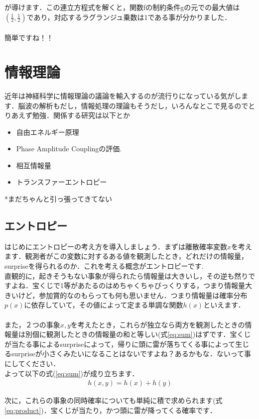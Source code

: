 \documentclass[11pt,a4paper,uplatex]{ujreport}
\begin{document}
が導けます．この連立方程式を解くと，関数fの制約条件gの元での最大値は$(\frac{1}{2}, \frac{1}{2})$であり，対応するラグランジュ乗数は1である事が分かりました．\\
\\

簡単ですね！！

\chapter{情報理論}
近年は神経科学に情報理論の議論を輸入するのが流行りになっている気がします．脳波の解析もだし，情報処理の理論もそうだし，いろんなとこで見るのでとりあえず勉強．関係する研究は以下とか\\
\begin{itemize}
 \item{自由エネルギー原理\cite{fep}}
 \item{Phase Amplitude Couplingの評価. \cite{tort}}
 \item{相互情報量}
 \item{トランスファーエントロピー}
\end{itemize}
*まだちゃんと引っ張ってきてない
\section{エントロピー}
はじめにエントロピーの考え方を導入しましょう．まずは離散確率変数$x$を考えます．観測者がこの変数に対するある値を観測したとき，どれだけの情報量，surpriseを得られるのか．これを考える概念がエントロピーです.\\
直観的に，起きそうもない事象が得られたら情報量は大きいし，その逆も然りですよね．宝くじで1等があたるのはめちゃくちゃびっくりする，つまり情報量大きいけど，参加賞的なのもらっても何も思いません．つまり情報量は確率分布$p(x)$に依存していて，その値によって定まる単調な関数$h(x)$といえます．\\
\\
また，２つの事象$x, y$を考えたとき，これらが独立なら両方を観測したときの情報量は別個に観測したときの情報量の和と等しい(式\ref{eq:sum})はずです．宝くじが当たる事によるsurpriseによって，帰りに頭に雷が落ちてくる事によって生じるsurpriseが小さくみたいになることはないですよね？あるかもな．ないって事にしてください．\\
よって以下の式(\ref{eq:sum})が成り立ちます．
\begin{eqnarray}
\label{eq:sum}
h(x,y) = h(x) + h(y)
\end{eqnarray}

次に，これらの事象の同時確率についても単純に積で求められます(式\ref{eq:product})．宝くじが当たり，かつ頭に雷が降ってくる確率です．
\end{document}
